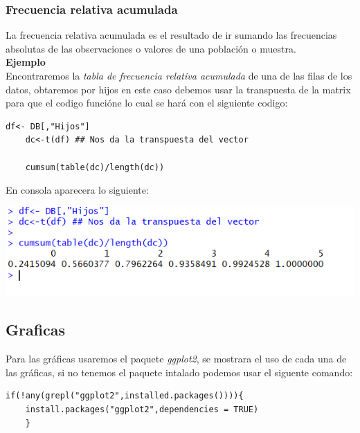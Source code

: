 \documentclass[12pt,hidelinks]{article}
\begin{document}
	\subsubsection{Frecuencia relativa acumulada}
	La frecuencia relativa acumulada es el resultado de ir sumando las frecuencias absolutas de las observaciones o valores de una población o muestra.\\
	\textbf{Ejemplo}\\
	\vspace{2mm}
	Encontraremos la \textit{tabla de frecuencia relativa acumulada} de una de las filas de los datos, obtaremos por hijos  en este caso debemos usar la transpuesta de la matrix para que el codigo funcióne lo cual se hará con el siguiente codigo:
	\begin{lstlisting}[frame=single]
	df<- DB[,"Hijos"]
	dc<-t(df) ## Nos da la transpuesta del vector
	
	cumsum(table(dc)/length(dc))
	\end{lstlisting}
	En consola aparecera lo siguiente:
	\begin{center}
		\includegraphics[width=\linewidth]{TFrelativaAcum.PNG}
	\end{center}
	\newpage
	\subsection{Graficas}
	Para las gráficas usaremos el paquete \textit{ggplot2}, se mostrara el uso de cada una de las gráficas, si no tenemos el paquete intalado podemos usar el siguente comando:
	
	\begin{lstlisting}[frame=single]
	if(!any(grepl("ggplot2",installed.packages()))){
	install.packages("ggplot2",dependencies = TRUE)
	}
	\end{lstlisting}
\end{document}
